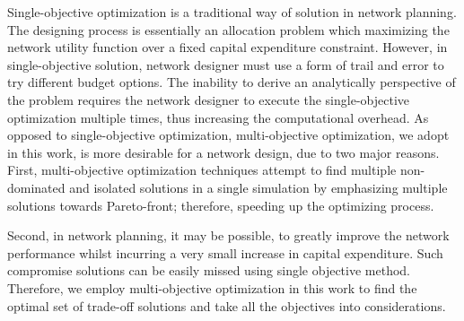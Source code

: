 \documentclass[10pt,journal,compsoc]{IEEEtran}
\begin{document}
Single-objective optimization is a traditional way of solution in network planning. The designing process is essentially an allocation problem which maximizing the network utility function over a fixed capital expenditure constraint. 
However, in single-objective solution, network designer must use a form of trail and error to try different budget options. The inability to derive an analytically perspective of the problem requires the network designer to execute the single-objective optimization multiple times, thus increasing the computational overhead. 
As opposed to single-objective optimization, multi-objective optimization, we adopt in this work, is more desirable for a network design, due to two major reasons. First, multi-objective optimization techniques attempt to find multiple non-dominated and isolated solutions in a single simulation by emphasizing multiple solutions towards Pareto-front; therefore, speeding up the optimizing process. 

Second, in network planning, it may be possible, to greatly improve the network performance whilst incurring a very small increase in capital expenditure. Such compromise solutions can be easily missed using single objective method. Therefore, we employ multi-objective optimization in this work to find the optimal set of trade-off solutions and take all the objectives into considerations.

\iffalse
\end{document}
